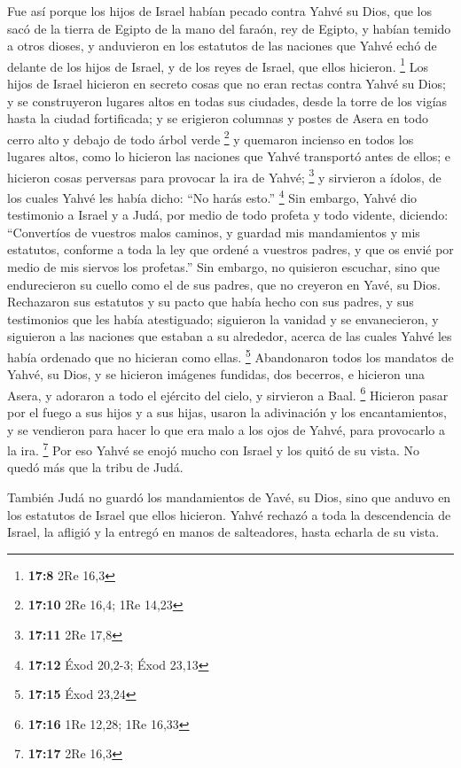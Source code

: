 \begin{paracol}{2}
 Fue así porque los hijos de Israel habían pecado contra
Yahvé su Dios, que los sacó de la tierra de Egipto de la mano del
faraón, rey de Egipto, y habían temido a otros dioses,  y
anduvieron en los estatutos de las naciones que Yahvé echó de delante de
los hijos de Israel, y de los reyes de Israel, que ellos hicieron.
\footnote{\textbf{17:8} 2Re 16,3}  Los hijos de Israel
hicieron en secreto cosas que no eran rectas contra Yahvé su Dios; y se
construyeron lugares altos en todas sus ciudades, desde la torre de los
vigías hasta la ciudad fortificada;  y se erigieron
columnas y postes de Asera en todo cerro alto y debajo de todo árbol
verde \footnote{\textbf{17:10} 2Re 16,4; 1Re 14,23}  y
quemaron incienso en todos los lugares altos, como lo hicieron las
naciones que Yahvé transportó antes de ellos; e hicieron cosas perversas
para provocar la ira de Yahvé; \footnote{\textbf{17:11} 2Re 17,8}
 y sirvieron a ídolos, de los cuales Yahvé les había
dicho: ``No harás esto.'' \footnote{\textbf{17:12} Éxod 20,2-3; Éxod
  23,13}  Sin embargo, Yahvé dio testimonio a Israel y a
Judá, por medio de todo profeta y todo vidente, diciendo: ``Convertíos
de vuestros malos caminos, y guardad mis mandamientos y mis estatutos,
conforme a toda la ley que ordené a vuestros padres, y que os envié por
medio de mis siervos los profetas.''  Sin embargo, no
quisieron escuchar, sino que endurecieron su cuello como el de sus
padres, que no creyeron en Yavé, su Dios.  Rechazaron sus
estatutos y su pacto que había hecho con sus padres, y sus testimonios
que les había atestiguado; siguieron la vanidad y se envanecieron, y
siguieron a las naciones que estaban a su alrededor, acerca de las
cuales Yahvé les había ordenado que no hicieran como ellas. \footnote{\textbf{17:15}
  Éxod 23,24}  Abandonaron todos los mandatos de Yahvé,
su Dios, y se hicieron imágenes fundidas, dos becerros, e hicieron una
Asera, y adoraron a todo el ejército del cielo, y sirvieron a Baal.
\footnote{\textbf{17:16} 1Re 12,28; 1Re 16,33}  Hicieron
pasar por el fuego a sus hijos y a sus hijas, usaron la adivinación y
los encantamientos, y se vendieron para hacer lo que era malo a los ojos
de Yahvé, para provocarlo a la ira. \footnote{\textbf{17:17} 2Re 16,3}
 Por eso Yahvé se enojó mucho con Israel y los quitó de
su vista. No quedó más que la tribu de Judá.

 También Judá no guardó los mandamientos de Yavé, su
Dios, sino que anduvo en los estatutos de Israel que ellos hicieron.
 Yahvé rechazó a toda la descendencia de Israel, la
afligió y la entregó en manos de salteadores, hasta echarla de su vista.


\end{paracol}
